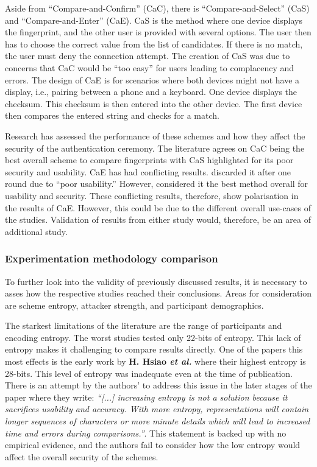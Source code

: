 Aside from ``Compare-and-Confirm'' (CaC), there is ``Compare-and-Select'' (CaS) and ``Compare-and-Enter'' (CaE). CaS is the method where one device displays the fingerprint, and the other user is provided with several options. The user then has to choose the correct value from the list of candidates. If there is no match, the user must deny the connection attempt. The creation of CaS was due to concerns that CaC would be ``too easy'' for users leading to complacency and errors\cite{uzun2007usability}. The design of CaE is for scenarios where both devices might not have a display, i.e., pairing between a phone and a keyboard. One device displays the checksum. This checksum is then entered into the other device. The first device then compares the entered string and checks for a match.

Research has assessed the performance of these schemes and how they affect the security of the authentication ceremony. The literature agrees on CaC being the best overall scheme to compare fingerprints \cite{tan2017can}\cite{uzun2007usability} with CaS highlighted for its poor security and usability. CaE has had conflicting results. \cite{uzun2007usability} discarded it after one round due to ``poor usability.'' However, \cite{tan2017can} considered it the best method overall for usability and security. These conflicting results, therefore, show polarisation in the results of CaE. However, this could be due to the different overall use-cases of the studies. Validation of results from either study would, therefore, be an area of additional study.

\subsubsection*{Experimentation methodology comparison}
To further look into the validity of previously discussed results, it is necessary to asses how the respective studies reached their conclusions. Areas for consideration are scheme entropy, attacker strength, and participant demographics.

The starkest limitations of the literature are the range of participants and encoding entropy. The worst studies tested only 22-bits of entropy. This lack of entropy makes it challenging to compare results directly. One of the papers this most effects is the early work by \textbf{H. Hsiao \textit{et al.}}\cite{hsiao2009study}  where their highest entropy is 28-bits. This level of entropy was inadequate even at the time of publication. There is an attempt by the authors' to address this issue in the later stages of the paper where they write: \textit{``[...] increasing entropy is not a solution because it sacrifices usability and accuracy. With more entropy, representations will contain longer sequences of characters or more minute details which will lead to increased time and errors during comparisons.''}. This statement is backed up with no empirical evidence, and the authors fail to consider how the low entropy would affect the overall security of the schemes.

